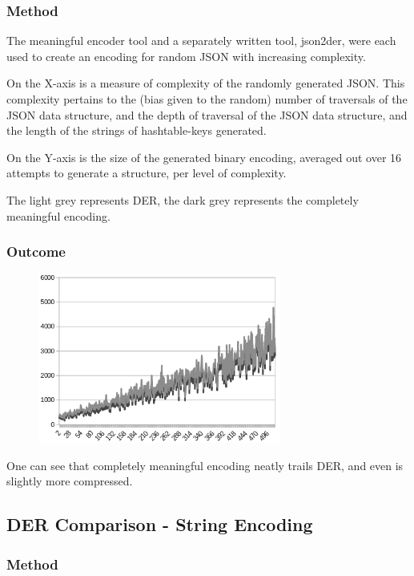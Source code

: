 \subsubsection{Method}

The meaningful encoder tool and a separately written tool, json2der, were
each used to create an encoding for random JSON with increasing complexity.

On the X-axis is a measure of complexity of the randomly generated
JSON. This complexity pertains to the (bias given to the random) number
of traversals of
the JSON data structure, and the
depth of traversal of the JSON data structure, and the length
of the strings of hashtable-keys generated.

On the Y-axis is the size of the generated binary encoding, averaged
out over 16 attempts to generate a structure, per level of complexity.

The light grey represents DER, the dark grey represents the completely
meaningful encoding.

\subsubsection{Outcome}

\begin{figure}[H]
\centering
\includegraphics[width=80mm]{comparison_chart}
\end{figure}

One can see that completely meaningful encoding neatly trails DER, and
even is slightly more compressed.

\subsection{DER Comparison - String Encoding}

\subsubsection{Method}

